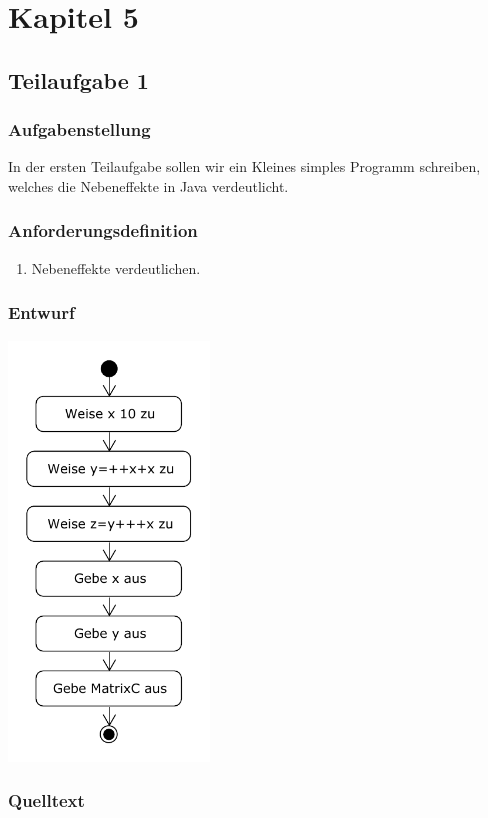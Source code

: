 \section{Kapitel 5}
\subsection{Teilaufgabe 1}
\subsubsection{Aufgabenstellung}
In der ersten Teilaufgabe sollen wir ein Kleines simples Programm schreiben,
welches die Nebeneffekte in Java verdeutlicht.

\subsubsection{Anforderungsdefinition}
\begin{enumerate}
	\item Nebeneffekte verdeutlichen.
\end{enumerate}

\subsubsection{Entwurf}
\begin{center}
	\includegraphics[width=0.4\textwidth]{uml/uml_c5_p1.pdf}
\end{center}

\subsubsection{Quelltext}
